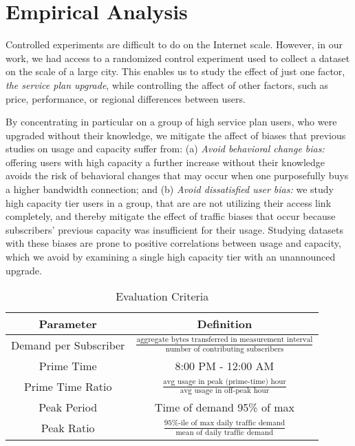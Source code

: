 \section{Empirical Analysis}\label{sec:analysis}


Controlled experiments are difficult to do on the Internet scale. However, in 
our work, we had access to a randomized control experiment used to collect a 
dataset on the scale of a large city. This enables us to study the effect of 
just one factor, \emph{the service plan upgrade}, while controlling the affect 
of other factors, such as price, performance, or regional differences between 
users.

By concentrating in particular on a group of high service plan users, who were 
upgraded without their knowledge, we mitigate the affect of biases that 
previous studies on usage and capacity suffer from: (a) \emph{Avoid behavioral 
change bias:} offering users with high capacity a further increase without 
their knowledge avoids the risk of behavioral changes that may occur when one 
purposefully buys a higher bandwidth connection; and (b) \emph{Avoid 
dissatisfied user bias:} we study high capacity tier users in a \control{} 
group, that are are not utilizing their access link completely, and thereby 
mitigate the effect of traffic biases that occur because subscribers' previous 
capacity was insufficient for their usage. Studying datasets with these biases 
are prone to positive correlations between usage and capacity, which we 
avoid by examining a single high capacity tier with an unannounced upgrade.

\begin{table}[ht]
\small 
\begin{tabular}{| c | c |}\hline
\textbf{Parameter} & \textbf{Definition}	\\\hline
Demand per Subscriber& \(\frac{\text{aggregate bytes transferred in 
measurement interval}}{\text{number of contributing subscribers}}\)	\\
Prime Time		& 8:00 PM - 12:00 AM   		\\
Prime Time Ratio 	& \( \frac{ \text{avg usage in peak (prime-time) 
hour}}{ \text{avg usage in off-peak hour}}\) 		\\
Peak Period		& Time of demand 95\% of max    \\
Peak Ratio 		& \(\frac{\text{95\%-ile of max daily 
traffic demand}}{\text{mean of daily traffic demand}}\)	\\\hline
\end{tabular}
\caption{Evaluation Criteria}
\label{tab:eval-criteria}
\end{table}



